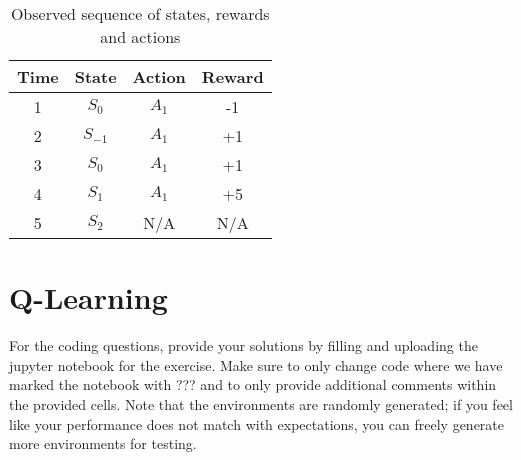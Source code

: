 \documentclass[12pt,
               addpoints,
	       answers
               ]{exam}
\begin{document}
    \begin{table}[h]
        \centering
        \begin{tabular}{c|c|c|c}
            \textbf{Time} & \textbf{State} & \textbf{Action} & \textbf{Reward} \\
            \hline 1 & $S_{0}$ & $A_{1}$ & -1 \\
            2 & $S_{-1}$ & $A_{1}$ & +1 \\
            3 & $S_{0}$ & $A_{1}$ & +1 \\
            4 & $S_{1}$ & $A_{1}$ & +5\\
            5 & $S_{2}$ & N/A & N/A \\
        \end{tabular}
        \caption{Observed sequence of states, rewards and actions}
        \label{tab:my_label}
    \end{table}
\begin{questions}

        
\end{questions}

\section{Q-Learning}
    For the coding questions, provide your solutions by filling and uploading the jupyter notebook for the exercise. Make sure to only change code where we have marked the notebook with ??? and to only provide additional comments within the provided cells. Note that the environments are randomly generated; if you feel like your performance does not match with expectations, you can freely generate more environments for testing.
\end{document}
